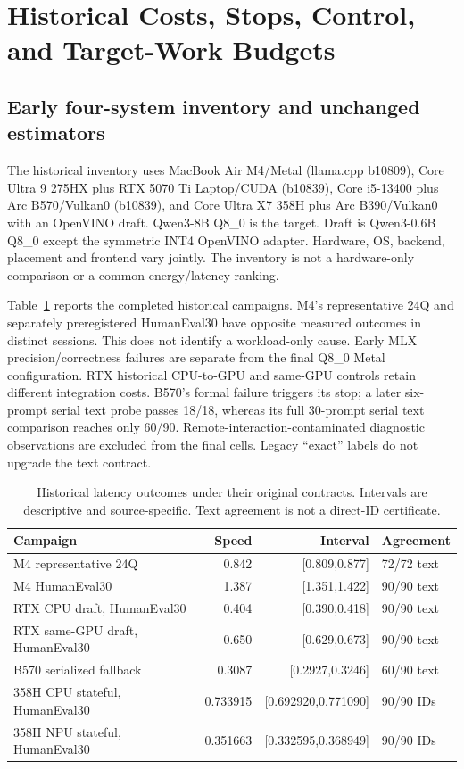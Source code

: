 \section{Historical Costs, Stops, Control, and Target-Work Budgets}
\label{supp:history}
\subsection{Early four-system inventory and unchanged estimators}
\label{supp:historical_inventory}
The historical inventory uses MacBook Air M4/Metal (llama.cpp b10809), Core Ultra 9 275HX plus RTX 5070 Ti Laptop/CUDA (b10839), Core i5-13400 plus Arc B570/Vulkan0 (b10839), and Core Ultra X7 358H plus Arc B390/Vulkan0 with an OpenVINO draft. Qwen3-8B Q8\_0 is the target. Draft is Qwen3-0.6B Q8\_0 except the symmetric INT4 OpenVINO adapter. Hardware, OS, backend, placement and frontend vary jointly. The inventory is not a hardware-only comparison or a common energy/latency ranking.

Table~\ref{tab:historical_cost} reports the completed historical campaigns. M4's representative 24Q and separately preregistered HumanEval30 have opposite measured outcomes in distinct sessions. This does not identify a workload-only cause. Early MLX precision/correctness failures are separate from the final Q8\_0 Metal configuration. RTX historical CPU-to-GPU and same-GPU controls retain different integration costs. B570's formal failure triggers its stop; a later six-prompt serial text probe passes 18/18, whereas its full 30-prompt serial text comparison reaches only 60/90. Remote-interaction-contaminated diagnostic observations are excluded from the final cells. Legacy ``exact'' labels do not upgrade the text contract.

\begin{table}[t]\centering\small
\caption{Historical latency outcomes under their original contracts. Intervals are descriptive and source-specific. Text agreement is not a direct-ID certificate.}
\label{tab:historical_cost}
\begin{tabularx}{\linewidth}{@{}Xrrl@{}}\toprule
Campaign & Speed & Interval & Agreement\\\midrule
M4 representative 24Q & 0.842 & [0.809,0.877] & 72/72 text\\
M4 HumanEval30 & 1.387 & [1.351,1.422] & 90/90 text\\
RTX CPU draft, HumanEval30 & 0.404 & [0.390,0.418] & 90/90 text\\
RTX same-GPU draft, HumanEval30 & 0.650 & [0.629,0.673] & 90/90 text\\
B570 serialized fallback & 0.3087 & [0.2927,0.3246] & 60/90 text\\
358H CPU stateful, HumanEval30 & 0.733915 & [0.692920,0.771090] & 90/90 IDs\\
358H NPU stateful, HumanEval30 & 0.351663 & [0.332595,0.368949] & 90/90 IDs\\\bottomrule
\end{tabularx}
\end{table}

